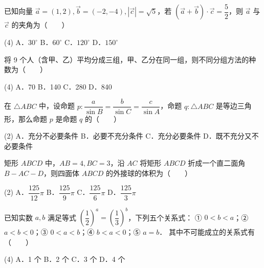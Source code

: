 \begin{question}
已知向量 $\vec{a} = (1, 2), \vec{b} = (-2, -4), |\vec{c}| = \sqrt{5}$，若 $(\vec{a} + \vec{b}) \cdot \vec{c} = \dfrac{5}{2}$，则 $\vec{a}$ 与 $\vec{c}$ 的夹角为\mbox{（　　）}

\begin{gkopts}(4)
\task A．$30^\circ$
\task B．$60^\circ$
\task C．$120^\circ$
\task D．$150^\circ$
\end{gkopts}

\end{question}
\begin{question}
将 9 个人（含甲、乙）平均分成三组，甲、乙分在同一组，则不同分组方法的种数为\mbox{（　　）}

\begin{gkopts}(4)
\task A．70
\task B．140
\task C．280
\task D．840
\end{gkopts}

\end{question}
\begin{question}
在 $\triangle ABC$ 中，设命题 $p: \dfrac{a}{\sin B} = \dfrac{b}{\sin C} = \dfrac{c}{\sin A}$，命题 $q: \triangle ABC$ 是等边三角形，那么命题 $p$ 是命题 $q$ 的\mbox{（　　）}

\begin{gkopts}(2)
\task A．充分不必要条件
\task B．必要不充分条件
\task C．充分必要条件
\task D．既不充分又不必要条件
\end{gkopts}

\end{question}
\begin{question}
矩形 $ABCD$ 中，$AB = 4, BC = 3$，沿 $AC$ 将矩形 $ABCD$ 折成一个直二面角 $B - AC - D$，则四面体 $ABCD$ 的外接球的体积为\mbox{（　　）}

\begin{gkopts}(2)
\task A．$\dfrac{125}{12}\pi$
\task B．$\dfrac{125}{9}\pi$
\task C．$\dfrac{125}{6}\pi$
\task D．$\dfrac{125}{3}\pi$
\end{gkopts}

\end{question}
\begin{question}
已知实数 $a, b$ 满足等式 $\left(\dfrac{1}{2}\right)^a = \left(\dfrac{1}{3}\right)^b$，下列五个关系式：
① $0 < b < a$；② $a < b < 0$；③ $0 < a < b$；④ $b < a < 0$；⑤ $a = b$．
其中不可能成立的关系式有\mbox{（　　）}

\begin{gkopts}(4)
\task A．1 个
\task B．2 个
\task C．3 个
\task D．4 个
\end{gkopts}

\end{question}
